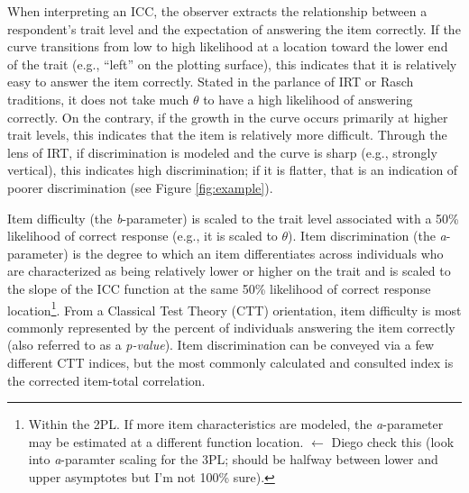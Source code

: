 \documentclass[
  man]{apa6}
\begin{document}
When interpreting an ICC, the observer extracts the relationship between a respondent's trait level and the expectation of answering the item correctly. If the curve transitions from low to high likelihood at a location toward the lower end of the trait (e.g., ``left'' on the plotting surface), this indicates that it is relatively easy to answer the item correctly. Stated in the parlance of IRT or Rasch traditions, it does not take much \(\theta\) to have a high likelihood of answering correctly. On the contrary, if the growth in the curve occurs primarily at higher trait levels, this indicates that the item is relatively more difficult. Through the lens of IRT, if discrimination is modeled and the curve is sharp (e.g., strongly vertical), this indicates high discrimination; if it is flatter, that is an indication of poorer discrimination (see Figure \ref{fig:example}).

Item difficulty (the \emph{b}-parameter) is scaled to the trait level associated with a 50\% likelihood of correct response (e.g., it is scaled to \(\theta\)). Item discrimination (the \emph{a}-parameter) is the degree to which an item differentiates across individuals who are characterized as being relatively lower or higher on the trait and is scaled to the slope of the ICC function at the same 50\% likelihood of correct response location\footnote{Within the 2PL. If more item characteristics are modeled, the \emph{a}-parameter may be estimated at a different function location. \(\leftarrow\) Diego check this (look into \emph{a}-paramter scaling for the 3PL; should be halfway between lower and upper asymptotes but I'm not 100\% sure).}. From a Classical Test Theory (CTT) orientation, item difficulty is most commonly represented by the percent of individuals answering the item correctly (also referred to as a \emph{p-value}). Item discrimination can be conveyed via a few different CTT indices, but the most commonly calculated and consulted index is the corrected item-total correlation.
\end{document}
